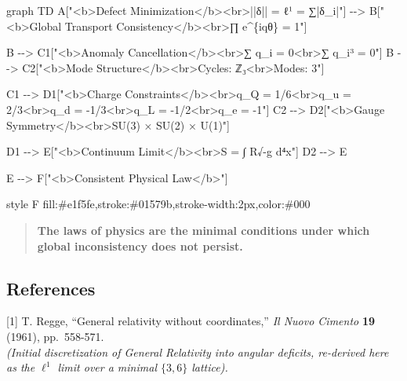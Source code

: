 \documentclass[
]{article}
\newenvironment{Shaded}{}{}
\newcommand{\NormalTok}[1]{#1}
\begin{document}
\begin{Shaded}
\begin{Highlighting}[]
\NormalTok{graph TD}
\NormalTok{    A["\textless{}b\textgreater{}Defect Minimization\textless{}/b\textgreater{}\textless{}br\textgreater{}||δ|| = ℓ¹ = ∑|δ\_i|"] {-}{-}\textgreater{} B["\textless{}b\textgreater{}Global Transport Consistency\textless{}/b\textgreater{}\textless{}br\textgreater{}∏ e\^{}\{iqθ\} = 1"]}
    
\NormalTok{    B {-}{-}\textgreater{} C1["\textless{}b\textgreater{}Anomaly Cancellation\textless{}/b\textgreater{}\textless{}br\textgreater{}∑ q\_i = 0\textless{}br\textgreater{}∑ q\_i³ = 0"]}
\NormalTok{    B {-}{-}\textgreater{} C2["\textless{}b\textgreater{}Mode Structure\textless{}/b\textgreater{}\textless{}br\textgreater{}Cycles: ℤ₃\textless{}br\textgreater{}Modes: 3"]}
    
\NormalTok{    C1 {-}{-}\textgreater{} D1["\textless{}b\textgreater{}Charge Constraints\textless{}/b\textgreater{}\textless{}br\textgreater{}q\_Q = 1/6\textless{}br\textgreater{}q\_u = 2/3\textless{}br\textgreater{}q\_d = {-}1/3\textless{}br\textgreater{}q\_L = {-}1/2\textless{}br\textgreater{}q\_e = {-}1"]}
\NormalTok{    C2 {-}{-}\textgreater{} D2["\textless{}b\textgreater{}Gauge Symmetry\textless{}/b\textgreater{}\textless{}br\textgreater{}SU(3) × SU(2) × U(1)"]}
    
\NormalTok{    D1 {-}{-}\textgreater{} E["\textless{}b\textgreater{}Continuum Limit\textless{}/b\textgreater{}\textless{}br\textgreater{}S = ∫ R√{-}g d⁴x"]}
\NormalTok{    D2 {-}{-}\textgreater{} E}
    
\NormalTok{    E {-}{-}\textgreater{} F["\textless{}b\textgreater{}Consistent Physical Law\textless{}/b\textgreater{}"]}
    
\NormalTok{    style F fill:\#e1f5fe,stroke:\#01579b,stroke{-}width:2px,color:\#000}
\end{Highlighting}
\end{Shaded}

\begin{quote}
\textbf{The laws of physics are the minimal conditions under which
global inconsistency does not persist.}
\end{quote}

\subsection{References}\label{references}

{[}1{]} T. Regge, ``General relativity without coordinates,'' \emph{Il
Nuovo Cimento} \textbf{19} (1961), pp.~558-571.\\
\emph{(Initial discretization of General Relativity into angular
deficits, re-derived here as the \(\ell^1\) limit over a minimal
\(\{3,6\}\) lattice).}
\end{document}
